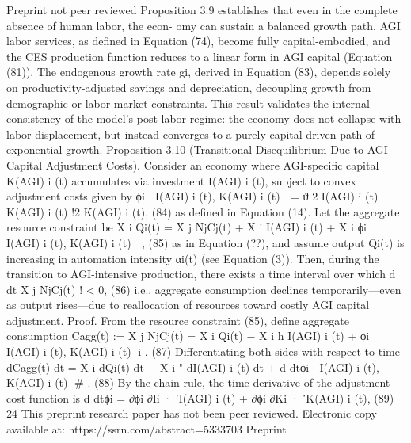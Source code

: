 Preprint not peer reviewed
Proposition 3.9 establishes that even in the complete absence of human labor, the econ-
omy can sustain a balanced growth path. AGI labor services, as defined in Equation (74),
become fully capital-embodied, and the CES production function reduces to a linear form
in AGI capital (Equation (81)). The endogenous growth rate gi, derived in Equation (83),
depends solely on productivity-adjusted savings and depreciation, decoupling growth from
demographic or labor-market constraints. This result validates the internal consistency of
the model’s post-labor regime: the economy does not collapse with labor displacement, but
instead converges to a purely capital-driven path of exponential growth.
Proposition 3.10 (Transitional Disequilibrium Due to AGI Capital Adjustment Costs).
Consider an economy where AGI-specific capital K(AGI)
i
(t) accumulates via investment I(AGI)
i
(t),
subject to convex adjustment costs given by
ϕi

I(AGI)
i
(t), K(AGI)
i
(t)

= ϑ
2
I(AGI)
i
(t)
K(AGI)
i
(t)
!2
K(AGI)
i
(t),
(84)
as defined in Equation (14). Let the aggregate resource constraint be
X
i
Qi(t) =
X
j
NjCj(t) +
X
i
I(AGI)
i
(t) +
X
i
ϕi

I(AGI)
i
(t), K(AGI)
i
(t)

,
(85)
as in Equation (??), and assume output Qi(t) is increasing in automation intensity αi(t)
(see Equation (3)).
Then, during the transition to AGI-intensive production, there exists a time interval over
which
d
dt
 X
j
NjCj(t)
!
< 0,
(86)
i.e., aggregate consumption declines temporarily—even as output rises—due to reallocation
of resources toward costly AGI capital adjustment.
Proof. From the resource constraint (85), define aggregate consumption
Cagg(t) :=
X
j
NjCj(t) =
X
i
Qi(t) −
X
i
h
I(AGI)
i
(t) + ϕi

I(AGI)
i
(t), K(AGI)
i
(t)
i
.
(87)
Differentiating both sides with respect to time
dCagg(t)
dt
=
X
i
dQi(t)
dt
−
X
i
"
dI(AGI)
i
(t)
dt
+ d
dtϕi

I(AGI)
i
(t), K(AGI)
i
(t)
\#
.
(88)
By the chain rule, the time derivative of the adjustment cost function is
d
dtϕi = ∂ϕi
∂Ii
· ˙I(AGI)
i
(t) + ∂ϕi
∂Ki
· ˙K(AGI)
i
(t),
(89)
24
This preprint research paper has not been peer reviewed. Electronic copy available at: https://ssrn.com/abstract=5333703
Preprint 

